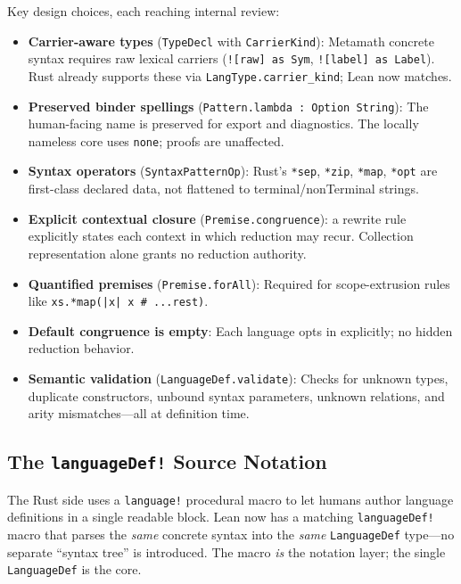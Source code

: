 \documentclass[11pt]{article}
\newcommand{\code}[1]{\texttt{#1}}
\begin{document}
Key design choices, each reaching internal review:
\begin{itemize}
\item \textbf{Carrier-aware types} (\code{TypeDecl} with \code{CarrierKind}):
  Metamath concrete syntax requires raw lexical carriers (\code{![raw] as Sym},
  \code{![label] as Label}). Rust already supports these via
  \code{LangType.carrier\_kind}; Lean now matches.
\item \textbf{Preserved binder spellings} (\code{Pattern.lambda : Option String}):
  The human-facing name is preserved for export and diagnostics.
  The locally nameless core uses \code{none}; proofs are unaffected.
\item \textbf{Syntax operators} (\code{SyntaxPatternOp}):
  Rust's \code{*sep}, \code{*zip}, \code{*map}, \code{*opt} are first-class
  declared data, not flattened to terminal/nonTerminal strings.
\item \textbf{Explicit contextual closure} (\code{Premise.congruence}):
  a rewrite rule explicitly states each context in which reduction may recur.
  Collection representation alone grants no reduction authority.
\item \textbf{Quantified premises} (\code{Premise.forAll}):
  Required for scope-extrusion rules like
  \code{xs.*map(|x| x \# ...rest)}.
\item \textbf{Default congruence is empty}:
  Each language opts in explicitly; no hidden reduction behavior.
\item \textbf{Semantic validation} (\code{LanguageDef.validate}):
  Checks for unknown types, duplicate constructors, unbound syntax parameters,
  unknown relations, and arity mismatches---all at definition time.
\end{itemize}

\subsection{The \code{languageDef!} Source Notation}

The Rust side uses a \code{language!} procedural macro to let humans author
language definitions in a single readable block.  Lean now has a matching
\code{languageDef!} macro that parses the \emph{same} concrete syntax into the
\emph{same} \code{LanguageDef} type---no separate ``syntax tree'' is introduced.
The macro \emph{is} the notation layer; the single \code{LanguageDef} is the
core.
\end{document}

